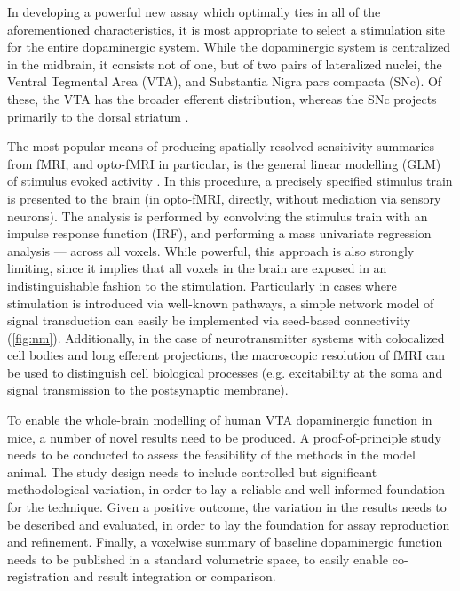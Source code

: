 In developing a powerful new assay which optimally ties in all of the aforementioned characteristics, it is most appropriate to select a stimulation site for the entire dopaminergic system.
While the dopaminergic system is centralized in the midbrain, it consists not of one, but of two pairs of lateralized nuclei, the Ventral Tegmental Area (VTA), and Substantia Nigra pars compacta (SNc).
Of these, the VTA has the broader efferent distribution, whereas the SNc projects primarily to the dorsal striatum \cite{Pan2010}.

The most popular means of producing spatially resolved sensitivity summaries from fMRI, and opto-fMRI in particular, is the general linear modelling (GLM) of stimulus evoked activity \cite{Friston1995}.
In this procedure, a precisely specified stimulus train is presented to the brain (in opto-fMRI, directly, without mediation via sensory neurons).
The analysis is performed by convolving the stimulus train with an impulse response function (IRF), and performing a mass univariate regression analysis --- across all voxels.
While powerful, this approach is also strongly limiting, since it implies that all voxels in the brain are exposed in an indistinguishable fashion to the stimulation.
Particularly in cases where stimulation is introduced via well-known pathways, a simple network model of signal transduction can easily be implemented via seed-based connectivity (\cref{fig:nm}).
Additionally, in the case of neurotransmitter systems with colocalized cell bodies and long efferent projections, the macroscopic resolution of fMRI can be used to distinguish cell biological processes (e.g. excitability at the soma and signal transmission to the postsynaptic membrane).

To enable the whole-brain modelling of human VTA dopaminergic function in mice, a number of novel results need to be produced.
A proof-of-principle study needs to be conducted to assess the feasibility of the methods in the model animal.
The study design needs to include controlled but significant methodological variation, in order to lay a reliable and well-informed foundation for the technique. 
Given a positive outcome, the variation in the results needs to be described and evaluated, in order to lay the foundation for assay reproduction and refinement.
Finally, a voxelwise summary of baseline dopaminergic function needs to be published in a standard volumetric space, to easily enable co-registration and result integration or comparison.

